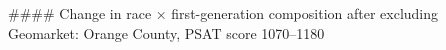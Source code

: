 #### Change in race × first-generation composition after excluding Geomarket: Orange County, PSAT score 1070–1180
